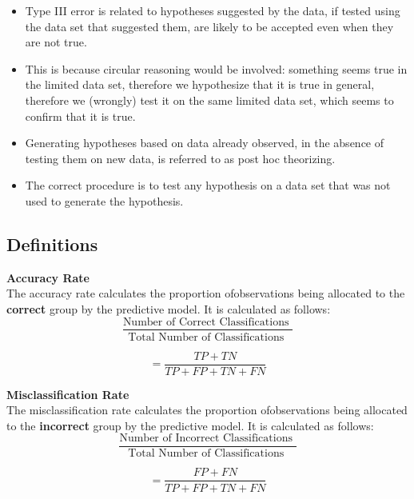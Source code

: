 \documentclass[12pt]{article}
\begin{document}
\begin{itemize}
\item Type III error is related to hypotheses suggested by the data, if tested using the data set that suggested them, are likely to be accepted even when they are not true. 

\item This is because circular reasoning would be involved: something seems true in the limited data set, therefore we hypothesize that it is true in general, therefore we (wrongly) test it on the same limited data set, which seems to confirm that it is true. 

\item Generating hypotheses based on data already observed, in the absence of testing them on new data, is referred to as post hoc theorizing.


\item The correct procedure is to test any hypothesis on a data set that was not used to generate the hypothesis.
\end{itemize}
\subsection*{Definitions}
\textbf{Accuracy Rate}\\
The accuracy rate calculates the proportion ofobservations being allocated to the \textbf{correct} group by the predictive model. It is calculated as follows:
\[ \frac{
\mbox{Number of Correct Classifications }}{\mbox{Total Number of Classifications }} \]

\[ = \frac{TP + TN}{TP+FP+TN+FN}\]


\noindent \textbf{Misclassification Rate}\\
The misclassification rate calculates the proportion ofobservations being allocated to the \textbf{incorrect} group by the predictive model. It is calculated as follows:
\[ \frac{
\mbox{Number of Incorrect Classifications }}{\mbox{Total Number of Classifications }} \]

\[ = \frac{FP + FN}{TP+FP+TN+FN}\]
\end{document}
